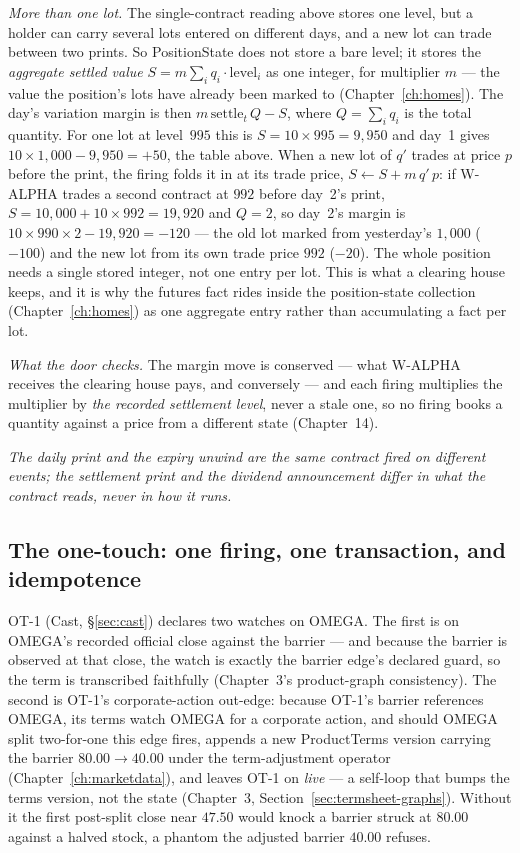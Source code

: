 \documentclass[11pt,a4paper]{article}
\begin{document}
\emph{More than one lot.} The single-contract reading above stores one level, but a holder
can carry several lots entered on different days, and a new lot can trade between two prints.
So PositionState does not store a bare level; it stores the \emph{aggregate settled value}
$S = m\sum_i q_i\cdot\text{level}_i$ as one integer, for multiplier $m$ --- the value the
position's lots have already been marked to (Chapter~\ref{ch:homes}). The day's variation
margin is then $m\,\text{settle}_t\,Q - S$, where $Q=\sum_i q_i$ is the total quantity. For
one lot at level~$995$ this is $S = 10\times 995 = 9{,}950$ and day~1 gives
$10\times 1{,}000 - 9{,}950 = +50$, the table above. When a new lot of $q'$ trades at price
$p$ before the print, the firing folds it in at its trade price, $S \leftarrow S + m\,q'\,p$:
if W-ALPHA trades a second contract at $992$ before day~2's print, $S = 10{,}000 + 10\times
992 = 19{,}920$ and $Q=2$, so day~2's margin is $10\times 990\times 2 - 19{,}920 = -120$ ---
the old lot marked from yesterday's $1{,}000$ ($-100$) and the new lot from its own trade
price $992$ ($-20$). The whole position needs a single stored integer, not one entry per lot.
This is what a clearing house keeps, and it is why the futures fact rides inside the
position-state collection (Chapter~\ref{ch:homes}) as one aggregate entry rather than
accumulating a fact per lot.

\emph{What the door checks.} The margin move is conserved --- what W-ALPHA
receives the clearing house pays, and conversely --- and each firing multiplies
the multiplier by \emph{the recorded settlement level}, never a stale one, so no
firing books a quantity against a price from a different state (Chapter~14).

\emph{The daily print and the expiry unwind are the same contract fired on
different events; the settlement print and the dividend announcement differ in
what the contract reads, never in how it runs.}

\subsection{The one-touch: one firing, one transaction, and idempotence}

OT-1 (Cast, \S\ref{sec:cast}) declares two watches on OMEGA. The first is on
OMEGA's recorded official close against the barrier --- and because the barrier is observed at that close,
the watch is exactly the barrier edge's declared guard, so the term is
transcribed faithfully (Chapter~3's product-graph consistency). The second is
OT-1's corporate-action out-edge: because OT-1's barrier references OMEGA, its
terms watch OMEGA for a corporate action, and should OMEGA split two-for-one this
edge fires, appends a new ProductTerms version carrying the barrier
$80.00 \rightarrow 40.00$ under the term-adjustment operator
(Chapter~\ref{ch:marketdata}), and leaves OT-1 on \emph{live} --- a self-loop that
bumps the terms version, not the state (Chapter~3,
Section~\ref{sec:termsheet-graphs}). Without it the first post-split close near
$47.50$ would knock a barrier struck at $80.00$ against a halved stock, a phantom
the adjusted barrier $40.00$ refuses.
\end{document}
